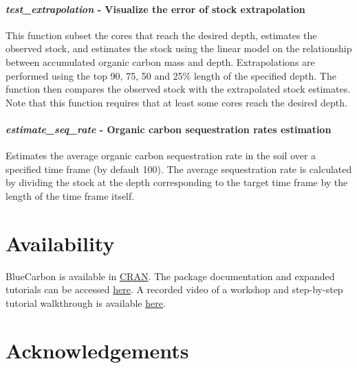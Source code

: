 \documentclass[10pt,a4paper,onecolumn]{article}
\let\oldparagraph\paragraph
\renewcommand{\paragraph}[1]{\oldparagraph{#1}\mbox{}}
\begin{document}
\paragraph{\texorpdfstring{\textbf{\emph{test\_extrapolation}} \textbf{-
Visualize the error of stock
extrapolation}}{test\_extrapolation - Visualize the error of stock extrapolation}}\label{test_extrapolation---visualize-the-error-of-stock-extrapolation}

This function subset the cores that reach the desired depth, estimates
the observed stock, and estimates the stock using the linear model on
the relationship between accumulated organic carbon mass and depth.
Extrapolations are performed using the top 90, 75, 50 and 25\% length of
the specified depth. The function then compares the observed stock with
the extrapolated stock estimates. Note that this function requires that
at least some cores reach the desired depth.

\paragraph{\texorpdfstring{\textbf{\emph{estimate\_seq\_rate}} \textbf{-
Organic carbon sequestration rates
estimation}}{estimate\_seq\_rate - Organic carbon sequestration rates estimation}}\label{estimate_seq_rate---organic-carbon-sequestration-rates-estimation}

Estimates the average organic carbon sequestration rate in the soil over
a specified time frame (by default 100). The average sequestration rate
is calculated by dividing the stock at the depth corresponding to the
target time frame by the length of the time frame itself.

\section{Availability}\label{availability}

BlueCarbon is available in
\href{https://cran.r-project.org/package=BlueCarbon}{CRAN}. The package
documentation and expanded tutorials can be accessed
\href{https://ecologyr.github.io/BlueCarbon/}{here}. A recorded video of
a workshop and step-by-step tutorial walkthrough is available
\href{https://www.youtube.com/watch?v=XCrrR3_MSHc&ab_channel=EcoinformaticaAEET}{here}.

\section{Acknowledgements}\label{acknowledgements}
\end{document}
